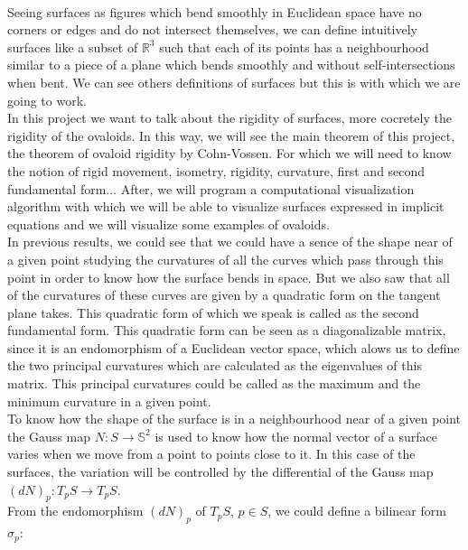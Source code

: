 \vspace{0.7cm}
\\


Seeing surfaces as figures which bend smoothly in Euclidean space have no corners or edges and do not intersect themselves, we can define intuitively surfaces like a subset of $\mathbb{R}^3$ such that each of its points has a neighbourhood similar to a piece of a plane which bends smoothly and without self-intersections when bent. We can see others definitions of surfaces but this is with which we are going to work.
${ }$\\

In this project we want to talk about the rigidity of surfaces, more cocretely the rigidity of the ovaloids. In this way, we will see the main theorem of this project, the theorem of ovaloid rigidity by Cohn-Vossen. For which we will need to know the notion of rigid movement, isometry, rigidity, curvature, first and second fundamental form... After, we will program a computational visualization algorithm with which we will be able to visualize surfaces expressed in implicit equations and we will visualize some examples of ovaloids.
${ }$\\

In previous results, we could see that we could have a sence of the shape near of a given point  studying the curvatures of all the curves which pass through this point in order to know how the surface bends in space. But we also saw that all of the curvatures of these curves are given by a quadratic form on the tangent plane takes. This quadratic form of which we speak is called as the second fundamental form. This quadratic form can be seen as a diagonalizable matrix, since it is an endomorphism of a Euclidean vector space, which alows us to define the two principal curvatures which are calculated as the eigenvalues of this matrix. This principal curvatures could be called as the maximum and the minimum curvature in a given point.
${ }$\\

To know how the shape of the surface is in a neighbourhood near of a given point the Gauss map $N : S \to \mathbb{S}^2$ is used to know how the normal vector of a surface varies when we move from a point to points close to it. In this case of the surfaces, the variation will be controlled by the differential of the Gauss map $(dN)_p : T_p S \to T_p S$.
${ }$\\

From the endomorphism $(dN)_p$ of $T_pS$, $p \in S$, we could define a bilinear form $\sigma_p$:

